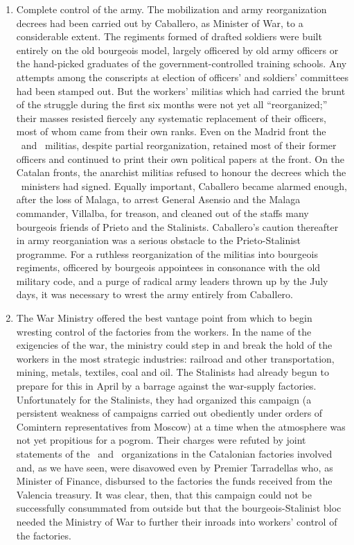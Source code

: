 \begin{enumerate}
  \item Complete control of the army. The mobilization and army reorganization decrees had been carried out by Caballero, as Minister of War, to a considerable extent. The regiments formed of drafted soldiers were built entirely on the old bourgeois model, largely officered by old army officers or the hand-picked graduates of the government-controlled training schools. Any attempts among the conscripts at election of officers’ and soldiers’ committees had been stamped out. But the workers’ militias which had carried the brunt of the struggle during the first six months were not yet all ``reorganized;'' their masses resisted fiercely any systematic replacement of their officers, most of whom came from their own ranks. Even on the Madrid front the \CNT\ and \UGT\ militias, despite partial reorganization, retained most of their former officers and continued to print their own political papers at the front. On the Catalan fronts, the anarchist militias refused to honour the decrees which the \CNT\ ministers had signed. Equally important, Caballero became alarmed enough, after the loss of Malaga, to arrest General Asensio and the Malaga commander, Villalba, for treason, and cleaned out of the staffs many bourgeois friends of Prieto and the Stalinists. Caballero’s caution thereafter in army reorganiation was a serious obstacle to the Prieto-Stalinist programme. For a ruthless reorganization of the militias into bourgeois regiments, officered by bourgeois appointees in consonance with the old military code, and a purge of radical army leaders thrown up by the July days, it was necessary to wrest the army entirely from Caballero.
  
  \item The War Ministry offered the best vantage point from which to begin wresting control of the factories from the workers. In the name of the exigencies of the war, the ministry could step in and break the hold of the workers in the most strategic industries: railroad and other transportation, mining, metals, textiles, coal and oil. The Stalinists had already begun to prepare for this in April by a barrage against the war-supply factories. Unfortunately for the Stalinists, they had organized this campaign (a persistent weakness of campaigns carried out obediently under orders of Comintern representatives from Moscow) at a time when the atmosphere was not yet propitious for a pogrom. Their charges were refuted by joint statements of the \CNT\ and \UGT\ organizations in the Catalonian factories involved and, as we have seen, were disavowed even by Premier Tarradellas who, as Minister of Finance, disbursed to the factories the funds received from the Valencia treasury. It was clear, then, that this campaign could not be successfully consummated from outside but that the bourgeois-Stalinist bloc needed the Ministry of War to further their inroads into workers’ control of the factories.
  

\end{enumerate}
